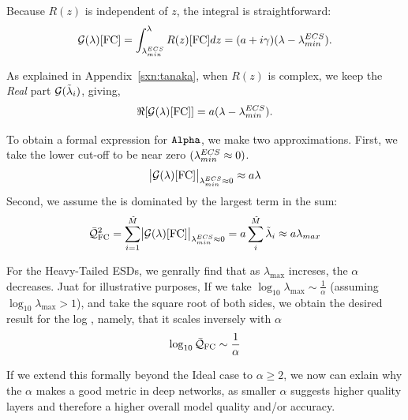 Because $R(z)$ is independent of $z$, the integral is straightforward:
\begin{equation}
\label{eqn:free_cauchy_G}
\mathcal{G(\lambda)}[\mathrm{FC}] = \int_{\lambda^{ECS}_{min}}^{\lambda} R(z)[\mathrm{FC}]dz = (a + i\gamma)(\lambda - \lambda^{ECS}_{min}).
\end{equation}

As explained in Appendix~\ref{sxn:tanaka}, when $R(z)$ is complex,  we keep the \emph{Real} part $\mathcal{G}(\tilde{\lambda}_{i})$, giving,
\begin{equation}
\label{eqn:free_cauchy_G_abs}
\Re[\mathcal{G(\lambda)}[\mathrm{FC}]] = a(\lambda - \lambda^{ECS}_{min}).
\end{equation}

To obtain a formal expression for $\texttt{Alpha}$, we make two approximations.
First, we take the lower cut-off to be near zero $(\lambda^{ECS}_{min} \approx 0)$.
\begin{equation}
\label{eqn:free_cauchy_G_max}
\bigl|\mathcal{G(\lambda)}[\mathrm{FC}]\bigr|_{\lambda^{ECS}_{min} \approx 0} \approx a\lambda
\end{equation}
Second, we assume the \LayerQualitySquared is dominated by the largest term in the sum:
\begin{equation}
\label{eqn:free_cauchy_G_max2}
\bar{\mathcal{Q}}^{2}_{\mathrm{FC}} = \sum_{i=1}^{\tilde{M}}\bigl|\mathcal{G(\lambda)}[\mathrm{FC}]\bigr|_{\lambda^{ECS}_{min} \approx 0}
= a\sum_{i}^{\tilde{M}} \tilde{\lambda}_{i} \approx a\lambda_{max}
\end{equation}

For the Heavy-Tailed ESDs, we genrally find that as $\lambda_{\max}$ increses, the \HTSR $\alpha$ decreases.
Juat for illustrative purposes,
If we take $\log_{10}\lambda_{\max}\sim\frac{1}{\alpha}$ (assuming $\log_{10}\lambda_{\max}>1$), and take the square root of both sides,
we obtain the desired result for the log \Quality, namely, that it scales inversely with $\alpha$
\begin{equation}
\label{eqn:free_cauchy_Q}
\log_{10}\bar{\mathcal{Q}}_{\mathrm{FC}} \sim \frac{1}{\alpha}
\end{equation}

If we extend this formally beyond the Ideal  case to $\alpha\ge 2$, we now can exlain why the \HTSR $\alpha$
makes a good \LayerQuality metric in deep networks,
as smaller $\alpha$ suggests higher quality layers and therefore a higher overall model quality and/or accuracy. 


